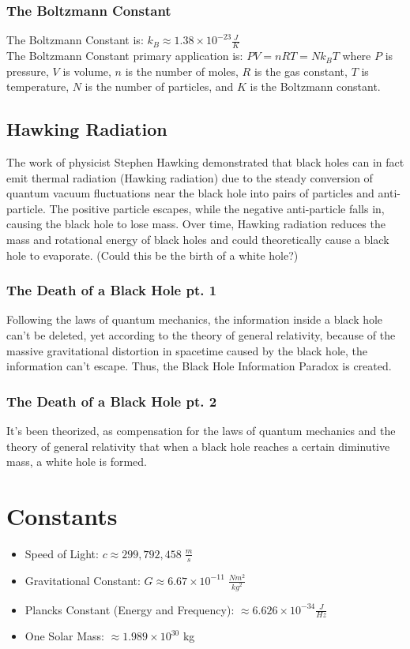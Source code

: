 \documentclass{article}
\begin{document}
\subsubsection{The Boltzmann Constant}
The Boltzmann Constant is: $k_B \approx 1.38 \times 10^{-23}\frac{J}{K}$ \\
The Boltzmann Constant primary application is: $PV = nRT = Nk_B T$ where $P$ is pressure, $V$ is volume, $n$ is the number of moles, $R$ is the gas constant, $T$ is temperature, $N$ is the number of particles, and $K$ is the Boltzmann constant.

\subsection{Hawking Radiation}
The work of physicist Stephen Hawking demonstrated that black holes can in fact emit thermal radiation (Hawking radiation) due to the steady conversion of quantum vacuum fluctuations near the black hole into pairs of particles and anti-particle. The positive particle escapes, while the negative anti-particle falls in, causing the black hole to lose mass. Over time, Hawking radiation reduces the mass and rotational energy of black holes and could theoretically cause a black hole to evaporate. (Could this be the birth of a white hole?)

\subsubsection{The Death of a Black Hole pt. 1}
Following the laws of quantum mechanics, the information inside a black hole can't be deleted, yet according to the theory of general relativity, because of the massive gravitational distortion in spacetime caused by the black hole, the information can't escape. Thus, the Black Hole Information Paradox is created.

\subsubsection{The Death of a Black Hole pt. 2}
It's been theorized, as compensation for the laws of quantum mechanics and the theory of general relativity that when a black hole reaches a certain diminutive mass, a white hole is formed.

\section{Constants}\label{sec:constants}
\begin{itemize}
    \item Speed of Light: $c \approx 299,792,458\;\frac{m}{s}$
    \item Gravitational Constant: $G \approx 6.67 \times 10^{-11}\;\frac{Nm^2}{kg^2}$
    \item Plancks Constant (Energy and Frequency): $\approx 6.626\times 10^{-34}\frac{J}{Hz}$
    \item One Solar Mass: $\approx 1.989 \times 10^{30}$ kg
\end{itemize}
\end{document}
